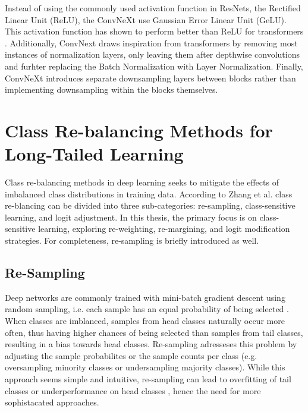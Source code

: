 Instead of using the commonly used activation function in ResNets, the Rectified Linear Unit (ReLU), the ConvNeXt use Gaussian Error Linear Unit (GeLU). This activation function has shown to perform better than ReLU for transformers \cite{liu2022convnet2020s}. Additionally, ConvNext draws inspiration from transformers by removing most instances of normalization layers, only leaving them after depthwise convolutions and furhter replacing the Batch Normalization with Layer Normalization. Finally, ConvNeXt introduces separate downsampling layers between blocks rather than implementing downsampling within the blocks themselves. 






\section{Class Re-balancing Methods for Long-Tailed Learning}
\label{sec:lt_methods}

Class re-balancing methods in deep learning seeks to mitigate the effects of imbalanced class distributions in training data. According to Zhang et al. \cite{zhang2023deep} class re-blancing can be divided into three sub-categories: re-sampling, class-sensitive learning, and logit adjustment. In this thesis, the primary focus is on class-sensitive learning, exploring re-weighting, re-margining, and logit modification strategies. For completeness, re-sampling is briefly introduced as well.


\subsection{Re-Sampling}
\label{sec:re-sampling}
Deep networks are commonly trained with mini-batch gradient descent using random sampling, i.e. each sample has an equal probability of being selected \cite{zhang2023deep}. When classes are imblanced, samples from head classes naturally occur more often, thus having higher chances of being selected than samples from tail classes, resulting in a bias towards head classes. Re-sampling adresseses this problem by adjusting the sample probabilites or the sample counts per class (e.g. oversampling minority classes or undersampling majority classes). While this approach seems simple and intuitive, re-sampling can lead to overfitting of tail classes or underperformance on head classes \cite{zhang2023deep}, hence the need for more sophistacated approaches.

